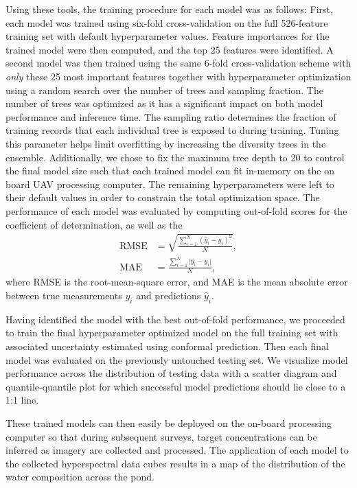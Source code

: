 \documentclass[remotesensing,article,submit,pdftex,moreauthors]{Definitions/mdpi}
\begin{document}
Using these tools, the training procedure for each model was as follows: First, each model was trained using six-fold cross-validation on the full 526-feature training set with default hyperparameter values. Feature importances for the trained model were then computed, and the top 25 features were identified. A second model was then trained using the same 6-fold cross-validation scheme with \textit{only} these 25 most important features together with hyperparameter optimization using a random search over the number of trees and sampling fraction. The number of trees was optimized as it has a significant impact on both model performance and inference time. The sampling ratio determines the fraction of training records that each individual tree is exposed to during training. Tuning this parameter helps limit overfitting by increasing the diversity trees in the ensemble. Additionally, we chose to fix the maximum tree depth to 20 to control the final model size such that each trained model can fit in-memory on the on board UAV processing computer. The remaining hyperparameters were left to their default values in order to constrain the total optimization space. The performance of each model was evaluated by computing out-of-fold scores for the coefficient of determination, as well as the
\begin{align}
    \text{RMSE} &= \sqrt{\frac{\sum\limits_{i=1}^N (\hat{y}_i-y_i)^2}{N}}, \\
    \text{MAE} &= \frac{\sum\limits_{i=1}^N \lvert \hat{y}_i - y_i \vert}{N},
\end{align}
where RMSE is the root-mean-square error, and MAE is the mean absolute error between true measurements $y_i$ and predictions $\hat{y}_i$.

Having identified the model with the best out-of-fold performance, we proceeded to train the final hyperparameter optimized model on the full training set with associated uncertainty estimated using conformal prediction.  Then each final model was evaluated on the previously untouched testing set. We visualize model performance across the distribution of testing data with a scatter diagram and quantile-quantile plot for which successful model predictions should lie close to a 1:1 line.

These trained models can then easily be deployed on the on-board processing computer so that during subsequent surveys, target concentrations can be inferred as imagery are collected and processed. The application of each model to the collected hyperspectral data cubes results in a map of the distribution of the water composition across the pond.
\end{document}
